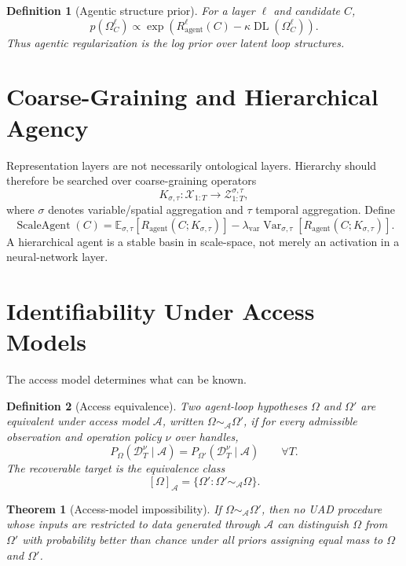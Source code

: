 \documentclass[11pt]{article}
\newtheorem{definition}{Definition}
\newtheorem{theorem}{Theorem}
\newcommand{\X}{\mathcal X}
\newcommand{\A}{\mathcal A}
\newcommand{\D}{\mathcal D}
\newcommand{\Z}{\mathcal Z}
\newcommand{\Expect}{\mathbb E}
\newcommand{\DL}{\operatorname{DL}}
\begin{document}
\begin{definition}[Agentic structure prior]
For a layer $\ell$ and candidate $C$,
\[
    p(\Omega^\ell_C)
    \propto
    \exp\left(
        R^\ell_{\mathrm{agent}}(C)
        -
        \kappa \DL(\Omega^\ell_C)
    \right).
\]
Thus agentic regularization is the log prior over latent loop structures.
\end{definition}

\section{Coarse-Graining and Hierarchical Agency}

Representation layers are not necessarily ontological layers. Hierarchy should
therefore be searched over coarse-graining operators
\[
    K_{\sigma,\tau}:\X_{1:T}\to \Z^{\sigma,\tau}_{1:T},
\]
where $\sigma$ denotes variable/spatial aggregation and $\tau$ temporal
aggregation. Define
\begin{equation}
    \operatorname{ScaleAgent}(C)
    =
    \Expect_{\sigma,\tau}
    \left[
        R_{\mathrm{agent}}(C;K_{\sigma,\tau})
    \right]
    -
    \lambda_{\mathrm{var}}
    \operatorname{Var}_{\sigma,\tau}
    \left[
        R_{\mathrm{agent}}(C;K_{\sigma,\tau})
    \right].
    \label{eq:scale-agent}
\end{equation}
A hierarchical agent is a stable basin in scale-space, not merely an activation
in a neural-network layer.

\section{Identifiability Under Access Models}

The access model determines what can be known.

\begin{definition}[Access equivalence]
Two agent-loop hypotheses $\Omega$ and $\Omega'$ are equivalent under access
model $\A$, written $\Omega\sim_\A\Omega'$, if for every admissible observation
and operation policy $\nu$ over handles,
\[
    P_\Omega(\D_T^\nu\mid \A)
    =
    P_{\Omega'}(\D_T^\nu\mid \A)
    \qquad
    \forall T.
\]
The recoverable target is the equivalence class
\[
    [\Omega]_\A=\{\Omega':\Omega'\sim_\A\Omega\}.
\]
\end{definition}

\begin{theorem}[Access-model impossibility]
If $\Omega\sim_\A\Omega'$, then no UAD procedure whose inputs are restricted to
data generated through $\A$ can distinguish $\Omega$ from $\Omega'$ with
probability better than chance under all priors assigning equal mass to
$\Omega$ and $\Omega'$.
\end{theorem}
\end{document}
